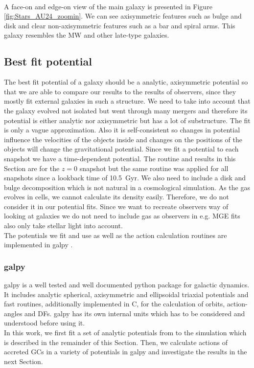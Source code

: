 \\A face-on and edge-on view of the main galaxy is presented in Figure \ref{fig:Stars_AU24_zoomin}. We can see axisymmetric features such as bulge and disk and clear non-axisymmetric features such as a bar and spiral arms. This galaxy resembles the \ac{MW} and other late-type galaxies.
\subsection{Best fit potential}\label{subsec:best_fit_pot}
The best fit potential of a galaxy should be a analytic, axisymmetric potential so that we are able  to compare our results to the results of observers, since they mostly fit external galaxies in such a structure. We need to take into account that the galaxy evolved not isolated but went through many mergers and therefore its potential is either analytic nor axisymmetric but has a lot of substructure. The fit is only a vague approximation. Also it is self-consistent so changes in potential influence the velocities of the objects inside and changes on the positions of the objects will change the gravitational potential. Since we fit a potential to each snapshot we have a time-dependent potential. The routine and results in this Section are for the $z=0$ snapshot but the same routine was applied for all snapshots since a lookback time of \SI{10.5}{Gyr}. We also need to include a disk and bulge decomposition which is not natural in a cosmological simulation. As the gas evolves in cells, we cannot calculate its density easily. Therefore, we do not consider it in our potential fits. Since we want to recreate observers way of looking at galaxies we do not need to include gas as observers in e.g. \ac{MGE} fits \citep{MGE...Monnet, MGE...Emsellem} also only take stellar light into account. 
\\The potentials we fit and use as well as the action calculation routines are implemented in galpy \citep{Bovy...galpy...2015}.

\subsubsection{galpy}\label{subsubsec:galpy}
galpy is a well tested and well documented python package for galactic dynamics. It includes analytic spherical, axisymmetric and ellipsoidal triaxial potentials and fast routines, additionally implemented in C, for the calculation of orbits, action-angles and \acp{DF}. galpy has its own internal units which has to be considered and understood before using it.
\\In this work, we first fit a set of analytic potentials from to the simulation which is described in the remainder of this Section. Then, we calculate actions of accreted \acp{GC} in a variety of potentials in galpy and investigate the results in the next Section. 

